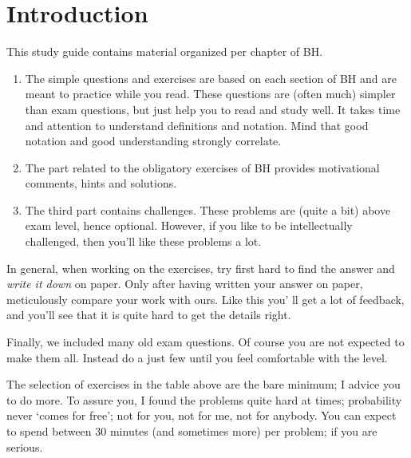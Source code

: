 \chapter*{Introduction}
\label{sec:orgb865fed}

This study guide contains material organized per chapter of BH.
\begin{enumerate}
\item The simple questions and exercises are based on each section of BH and  are meant to practice while you read.
These questions are (often much) simpler than exam questions, but just help you to read and study well. It takes time and attention to understand definitions and notation. Mind that good notation and good understanding strongly correlate.
\item The part related to the obligatory exercises of BH provides motivational comments, hints and solutions.
\item The third part contains challenges.
These problems are (quite a bit) above exam level, hence optional.
However, if you like to be intellectually challenged, then you'll like these problems a lot.
\end{enumerate}


In general, when working on the exercises, try first hard to find the answer and \emph{write it down} on paper.  Only after having written your answer on paper, meticulously compare your work with ours. Like this you' ll get a lot of feedback, and you'll see that it is quite hard to get the details right.

Finally, we included many old exam questions. Of course you are not expected to make them all. Instead  do a just few until you feel comfortable with the level.

The selection of exercises in the table above are the bare minimum; I advice you to do more.
To assure you, I found the problems quite hard at times; probability never `comes for free'; not for you, not for me, not for anybody.
You can expect to spend between 30 minutes (and sometimes more) per problem; if you are serious.



